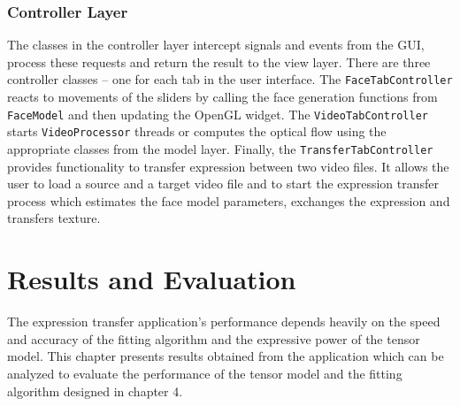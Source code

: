 \documentclass[11pt,a4paper,twoside]{report}
\begin{document}
\subsection{Controller Layer}
The classes in the controller layer intercept signals and events from the GUI,
process these requests and return the result to the view layer. There are three
controller classes -- one for each tab in the user interface. The
\texttt{FaceTabController} reacts to movements of the sliders by calling the
face generation functions from \texttt{FaceModel} and then updating the OpenGL
widget. The \texttt{VideoTabController} starts \texttt{VideoProcessor} threads
or computes the optical flow using the appropriate classes from the model
layer. Finally, the \texttt{TransferTabController} provides functionality to
transfer expression between two video files. It allows the user to load a source
and a target video file and to start the expression transfer process which
estimates the face model parameters, exchanges the expression and transfers
texture.


\chapter{Results and Evaluation}
The expression transfer application's performance depends heavily on the speed
and accuracy of the fitting algorithm and the expressive power of the tensor
model. This chapter presents results obtained from the application which can be
analyzed to evaluate the performance of the tensor model and the fitting
algorithm designed in chapter 4.
\end{document}
